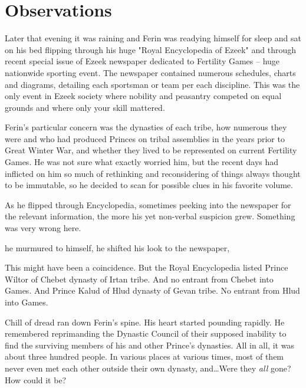


\section{Observations}

Later that evening it was raining and Ferin was readying himself for sleep and sat on his bed flipping through his huge "Royal Encyclopedia of Ezeek" and through recent special issue of Ezeek newspaper dedicated to Fertility Games -- huge nationwide sporting event. The newspaper contained numerous schedules, charts and diagrams, detailing each sportsman or team per each discipline. This was the only event in Ezeek society where nobility and peasantry competed on equal grounds and where only your skill mattered.

Ferin's particular concern was the dynasties of each tribe, how numerous they were and who had produced Princes on tribal assemblies in the years prior to Great Winter War, and whether they lived to be represented on current Fertility Games. He was not sure what exactly worried him, but the recent days had inflicted on him so much of rethinking and reconsidering of things always thought to be immutable, so he decided to scan for possible clues in his favorite volume.

As he flipped through Encyclopedia, sometimes peeking into the newspaper for the relevant information, the more his yet non-verbal suspicion grew. Something was very wrong here.

 he murmured to himself,  he shifted his look to the newspaper, 

This might have been a coincidence. But the Royal Encyclopedia listed Prince Wiltor of Chebet dynasty of Irtan tribe. And no entrant from Chebet into Games. And Prince Kalud of Hlud dynasty of Gevan tribe. No entrant from Hlud into Games.

Chill of dread ran down Ferin's spine. His heart started pounding rapidly. He remembered reprimanding the Dynastic Council of their supposed inability to find the surviving members of his and other Prince's dynasties. All in all, it was about three hundred people. In various places at various times, most of them never even met each other outside their own dynasty, and\dots Were they \textit{all} gone? How could it be?

